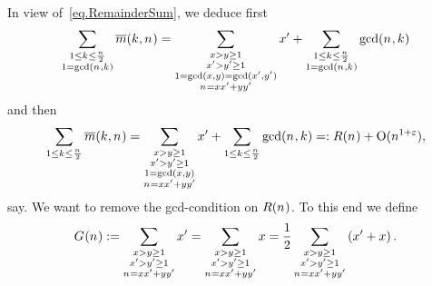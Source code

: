   In view of~\eqref{eq.RemainderSum}, we deduce first
  \[
    \Sum[{
      \substack{
        1\leq\Shift\leq\frac{\Size}{2}\\
        1=\gcdOf{\Size,\Shift}
      }
    }]{
      \RemainderSumOf{\Shift}{\Size}
    }
    =
    \Sum[{
      \substack{
        \LeftA > \RightA \geq 1 \\
        \LeftB > \RightB \geq 1 \\
        1 = \gcdOf{\LeftA,\RightA} = \gcdOf{\LeftB,\RightB} \\
        \Size = \LeftA\LeftB+\RightA\RightB
      }
    }]
    \LeftB
    +
    \Sum[{
      \substack{
        1\leq\Shift\leq\frac{\Size}{2}\\
        1=\gcdOf{\Size,\Shift}
      }
    }]{
      \gcdOf{\Size,\Shift}
    }
  \]
  and then
  \begin{equation}\label{eq.invquant}
    \Sum[{
      \substack{
        1\leq\Shift\leq\frac{\Size}{2}\\
      }
    }]{
      \RemainderSumOf{\Shift}{\Size}
    }
    =
    \Sum[{
      \substack{
        \LeftA > \RightA \geq 1 \\
        \LeftB > \RightB \geq 1 \\
        1 = \gcdOf{\LeftA,\RightA} \\
        \Size = \LeftA\LeftB+\RightA\RightB
      }
    }]
    \LeftB
    +
    \Sum[{
      \substack{
        1\leq\Shift\leq\frac{\Size}{2}\\
      }
    }]{
      \gcdOf{\Size,\Shift}
    }
   =:
    \InvQuantityOf{\Size}
    +
    \BigO{\Size^{1+\TheEpsilon}}
    ,
  \end{equation}  
  say. We want to remove the gcd-condition on $R(n_{})$. 
  To this end we define
  \[
    \TheQuantityOf{\Size}
    :=
    \Sum[{
      \substack{
        \LeftA > \RightA \geq 1 \\
        \LeftB > \RightB \geq 1 \\
        \Size = \LeftA\LeftB+\RightA\RightB
      }
    }]
    \LeftB
    =
    \Sum[{
      \substack{
        \LeftA > \RightA \geq 1 \\
        \LeftB > \RightB \geq 1 \\
        \Size = \LeftA\LeftB+\RightA\RightB
      }
    }]
    \LeftA
    =\frac12
    \Sum[{
      \substack{
        \LeftA > \RightA \geq 1 \\
        \LeftB > \RightB \geq 1 \\
        \Size = \LeftA\LeftB+\RightA\RightB
      }
    }]
    \Parens{\LeftB+\LeftA}.
  \]
